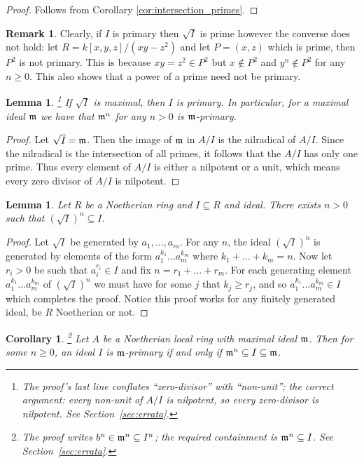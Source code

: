 \documentclass[12pt]{article}
\theoremstyle{plain}
\newtheorem{lemma}[thm]{Lemma}
\newtheorem{cor}[thm]{Corollary}
\theoremstyle{definition}
\newtheorem{remark}[thm]{Remark}
\begin{document}
\begin{proof}
Follows from Corollary \ref{cor:intersection_primes}.
\end{proof}
\begin{remark}
\label{rem:radical_prime}
Clearly, if $I$ is primary then $\sqrt{I}$ is prime however the converse does not hold: let $R = k[x,y,z]/(xy - z^2)$ and let $P = (x,z)$ which is prime, then $P^2$ is not primary. This is because $xy = z^2 \in P^2$ but $x \not\in P^2$ and $y^n \not\in P^2$ for any $n \geq 0$. This also shows that a power of a prime need not be primary.
\end{remark}
\begin{lemma}\footnote{The proof's last line conflates ``zero-divisor'' with ``non-unit''; the correct argument: every non-unit of $A/I$ is nilpotent, so every zero-divisor is nilpotent. See Section~\ref{sec:errata}.}
If $\sqrt{I}$ is maximal, then $I$ is primary. In particular, for a maximal ideal $\frak{m}$ we have that $\frak{m}^n$ for any $n > 0$ is $\frak{m}$-primary.
\end{lemma}
\begin{proof}
Let $\sqrt{I} = \frak{m}$. Then the image of $\frak{m}$ in $A/I$ is the nilradical of $A/I$. Since the nilradical is the intersection of all primes, it follows that the $A/I$ has only one prime. Thus every element of $A/I$ is either a nilpotent or a unit, which means every zero divisor of $A/I$ is nilpotent.
\end{proof}
\begin{lemma}
\label{lem:radical_power} Let $R$ be a Noetherian ring and $I \subseteq R$ and ideal. There exists $n > 0$ such that $(\sqrt{I})^n \subseteq I$.
\end{lemma}
\begin{proof}
Let $\sqrt{I}$ be generated by $a_1,...,a_m$. For any $n$, the ideal $(\sqrt{I})^n$ is generated by elements of the form $a_1^{k_1}...a_m^{k_m}$ where $k_1 + \hdots + k_m = n$. Now let $r_i>0$ be such that $a_i^{r_i} \in I$ and fix $n = r_1 + \hdots + r_m$. For each generating element $a_1^{k_1}...a_m^{k_m}$ of $(\sqrt{I})^n$ we must have for some $j$ that $k_j \geq r_j$, and so $a_1^{k_1}...a_m^{k_m} \in I$ which completes the proof. Notice this proof works for any finitely generated ideal, be $R$ Noetherian or not.
\end{proof}
\begin{cor}
\label{cor:primary_ideals_nested}\footnote{The proof writes $b^n \in \frak{m}^n \subseteq I^n$; the required containment is $\frak{m}^n \subseteq I$. See Section~\ref{sec:errata}.}
Let $A$ be a Noetherian local ring with maximal ideal $\frak{m}$. Then for some $n \geq 0$, an ideal $I$ is $\frak{m}$-primary if and only if $\frak{m}^n \subseteq I \subseteq \frak{m}$.
\end{cor}
\end{document}
